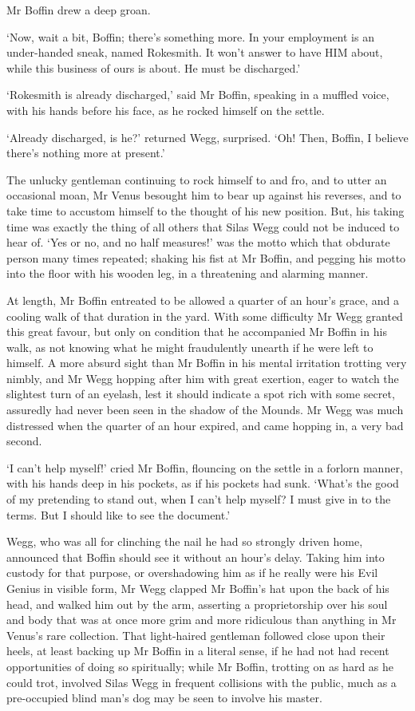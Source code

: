 Mr Boffin drew a deep groan.

‘Now, wait a bit, Boffin; there’s something more. In your employment
is an under-handed sneak, named Rokesmith. It won’t answer to have HIM
about, while this business of ours is about. He must be discharged.’

‘Rokesmith is already discharged,’ said Mr Boffin, speaking in a muffled
voice, with his hands before his face, as he rocked himself on the
settle.

‘Already discharged, is he?’ returned Wegg, surprised. ‘Oh! Then,
Boffin, I believe there’s nothing more at present.’

The unlucky gentleman continuing to rock himself to and fro, and to
utter an occasional moan, Mr Venus besought him to bear up against his
reverses, and to take time to accustom himself to the thought of his new
position. But, his taking time was exactly the thing of all others that
Silas Wegg could not be induced to hear of. ‘Yes or no, and no half
measures!’ was the motto which that obdurate person many times repeated;
shaking his fist at Mr Boffin, and pegging his motto into the floor with
his wooden leg, in a threatening and alarming manner.

At length, Mr Boffin entreated to be allowed a quarter of an hour’s
grace, and a cooling walk of that duration in the yard. With some
difficulty Mr Wegg granted this great favour, but only on condition
that he accompanied Mr Boffin in his walk, as not knowing what he might
fraudulently unearth if he were left to himself. A more absurd sight
than Mr Boffin in his mental irritation trotting very nimbly, and Mr
Wegg hopping after him with great exertion, eager to watch the slightest
turn of an eyelash, lest it should indicate a spot rich with some
secret, assuredly had never been seen in the shadow of the Mounds. Mr
Wegg was much distressed when the quarter of an hour expired, and came
hopping in, a very bad second.

‘I can’t help myself!’ cried Mr Boffin, flouncing on the settle in a
forlorn manner, with his hands deep in his pockets, as if his pockets
had sunk. ‘What’s the good of my pretending to stand out, when I can’t
help myself? I must give in to the terms. But I should like to see the
document.’

Wegg, who was all for clinching the nail he had so strongly driven home,
announced that Boffin should see it without an hour’s delay. Taking him
into custody for that purpose, or overshadowing him as if he really were
his Evil Genius in visible form, Mr Wegg clapped Mr Boffin’s hat
upon the back of his head, and walked him out by the arm, asserting a
proprietorship over his soul and body that was at once more grim and
more ridiculous than anything in Mr Venus’s rare collection. That
light-haired gentleman followed close upon their heels, at least backing
up Mr Boffin in a literal sense, if he had not had recent opportunities
of doing so spiritually; while Mr Boffin, trotting on as hard as he
could trot, involved Silas Wegg in frequent collisions with the public,
much as a pre-occupied blind man’s dog may be seen to involve his
master.

